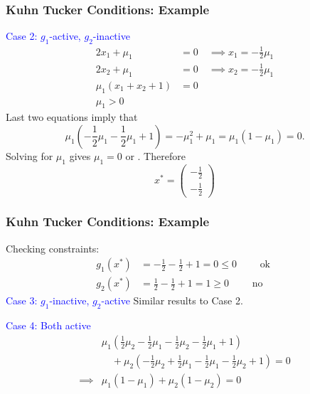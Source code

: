 \documentclass{beamer}
\begin{document}
\begin{frame}\frametitle{Kuhn Tucker Conditions: Example }
	\textcolor{blue}{Case 2: $g_1$-active, $g_2$-inactive}
	\begin{align*}
		2x_1 + \mu_1 &= 0 \quad\implies x_1 = -\frac{1}{2}\mu_1 \\
		2x_2 + \mu_1 &= 0 \quad\implies x_2 = -\frac{1}{2}\mu_1\\
		\mu_1(x_1 + x_2 + 1) &= 0\\
		\mu_1 > 0
	\end{align*}
	Last two equations imply that
	\[ 
	\mu_1(-\frac{1}{2}\mu_1-\frac{1}{2}\mu_1 + 1) = -\mu_1^2 + \mu_1 = \mu_1(1-\mu_1) = 0.
	\]
	Solving for $\mu_1$ gives $\mu_1 = 0$ or .
	Therefore 
	\[
		x^{\ast} = 
			\begin{pmatrix}
	    		-\frac{1}{2} \\
	    		-\frac{1}{2}
	  		\end{pmatrix}
	\]	
\end{frame}

\begin{frame}\frametitle{Kuhn Tucker Conditions: Example }
	Checking constraints:
	\begin{align*}
		g_1(x^{\ast}) &= -\frac{1}{2} -\frac{1}{2} + 1 = 0 \leq 0 \qquad \text{ ok }\\
		g_2(x^{\ast}) &= \frac{1}{2} -\frac{1}{2} + 1 = 1 \geq 0 \qquad \text{ no }
	\end{align*}	
	\textcolor{blue}{Case 3: $g_1$-inactive, $g_2$-active}
	 Similar results to Case 2.
	 
	 \vfill

	\textcolor{blue}{Case 4: Both active}
	\begin{align*}
		& \mu_1(\frac{1}{2}\mu_2 - \frac{1}{2}\mu_1 - \frac{1}{2}\mu_2-\frac{1}{2}\mu_1 + 1) \\
		& \quad 
		+ \mu_2(-\frac{1}{2}\mu_2 + \frac{1}{2}\mu_1 - \frac{1}{2}\mu_1 - \frac{1}{2}\mu_2 + 1) = 0 \\
		\implies & \mu_1(1-\mu_1) + \mu_2(1-\mu_2) = 0
	\end{align*}	
\end{frame}
	
\end{document}
